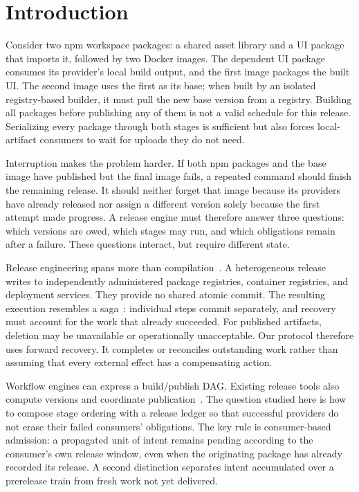 \section{Introduction}
\label{sec:intro}
Consider two npm workspace packages: a shared asset library and a UI package
that imports it, followed by two Docker images. The dependent UI package
consumes its provider's local build output, and the first image packages the
built UI. The second image uses the first as its base; when built by an isolated
registry-based builder, it must pull the new base version from a registry.
Building all packages before publishing any of them is not a valid schedule
for this release. Serializing every package through both stages is sufficient
but also forces local-artifact consumers to wait for uploads they do not need.

Interruption makes the problem harder. If both npm packages and the base image have
published but the final image fails, a repeated command should finish the
remaining release. It should neither forget that image because its providers
have already released nor assign a different version solely because the first
attempt made progress. A release engine must therefore answer three questions:
which versions are owed, which stages may run, and which obligations remain
after a failure. These questions interact, but require different state.

Release engineering spans more than compilation~\cite{adams}. A heterogeneous
release writes to independently administered package registries, container
registries, and deployment services. They provide no shared atomic commit.
The resulting execution resembles a saga~\cite{sagas}: individual steps commit
separately, and recovery must account for the work that already succeeded.
For published artifacts, deletion may be unavailable or operationally
unacceptable. Our protocol therefore uses forward recovery. It completes or
reconciles outstanding work rather than assuming that every external effect
has a compensating action.

Workflow engines can express a build/publish DAG. Existing release tools also
compute versions and coordinate publication~\cite{lerna,nx,changesets,
releaseplease,semanticrelease}. The question studied here is how to compose
stage ordering with a release ledger so that successful providers do not
erase their failed consumers' obligations. The key rule is consumer-based
admission: a propagated unit of intent remains pending according to the
consumer's own release window, even when the originating package has already
recorded its release. A second distinction separates intent accumulated over
a prerelease train from fresh work not yet delivered.

